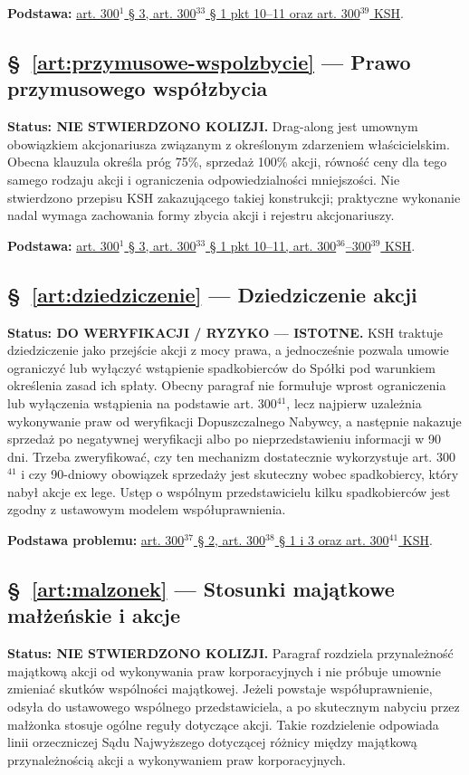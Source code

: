 \documentclass[12pt,a4paper]{report}
\newcounter{paragraf}
\begin{document}
\textbf{Podstawa:} \href{https://eli.gov.pl/api/acts/DU/2024/18/text.html}{art. 300$^{1}$ § 3, art. 300$^{33}$ § 1 pkt 10--11 oraz art. 300$^{39}$ KSH}.

\subsection*{§~\ref{art:przymusowe-wspolzbycie} — Prawo przymusowego współzbycia}
\textbf{Status: NIE STWIERDZONO KOLIZJI.} Drag-along jest umownym obowiązkiem akcjonariusza związanym z określonym zdarzeniem właścicielskim. Obecna klauzula określa próg 75\%, sprzedaż 100\% akcji, równość ceny dla tego samego rodzaju akcji i ograniczenia odpowiedzialności mniejszości. Nie stwierdzono przepisu KSH zakazującego takiej konstrukcji; praktyczne wykonanie nadal wymaga zachowania formy zbycia akcji i rejestru akcjonariuszy.

\textbf{Podstawa:} \href{https://eli.gov.pl/api/acts/DU/2024/18/text.html}{art. 300$^{1}$ § 3, art. 300$^{33}$ § 1 pkt 10--11, art. 300$^{36}$--300$^{39}$ KSH}.

\subsection*{§~\ref{art:dziedziczenie} — Dziedziczenie akcji}
\textbf{Status: DO WERYFIKACJI / RYZYKO — ISTOTNE.} KSH traktuje dziedziczenie jako przejście akcji z mocy prawa, a jednocześnie pozwala umowie ograniczyć lub wyłączyć wstąpienie spadkobierców do Spółki pod warunkiem określenia zasad ich spłaty. Obecny paragraf nie formułuje wprost ograniczenia lub wyłączenia wstąpienia na podstawie art. 300$^{41}$, lecz najpierw uzależnia wykonywanie praw od weryfikacji Dopuszczalnego Nabywcy, a następnie nakazuje sprzedaż po negatywnej weryfikacji albo po nieprzedstawieniu informacji w 90 dni. Trzeba zweryfikować, czy ten mechanizm dostatecznie wykorzystuje art. 300$^{41}$ i czy 90-dniowy obowiązek sprzedaży jest skuteczny wobec spadkobiercy, który nabył akcje ex lege. Ustęp o wspólnym przedstawicielu kilku spadkobierców jest zgodny z ustawowym modelem współuprawnienia.

\textbf{Podstawa problemu:} \href{https://eli.gov.pl/api/acts/DU/2024/18/text.html}{art. 300$^{37}$ § 2, art. 300$^{38}$ § 1 i 3 oraz art. 300$^{41}$ KSH}.

\subsection*{§~\ref{art:malzonek} — Stosunki majątkowe małżeńskie i akcje}
\textbf{Status: NIE STWIERDZONO KOLIZJI.} Paragraf rozdziela przynależność majątkową akcji od wykonywania praw korporacyjnych i nie próbuje umownie zmieniać skutków wspólności majątkowej. Jeżeli powstaje współuprawnienie, odsyła do ustawowego wspólnego przedstawiciela, a po skutecznym nabyciu przez małżonka stosuje ogólne reguły dotyczące akcji. Takie rozdzielenie odpowiada linii orzeczniczej Sądu Najwyższego dotyczącej różnicy między majątkową przynależnością akcji a wykonywaniem praw korporacyjnych.
\end{document}
